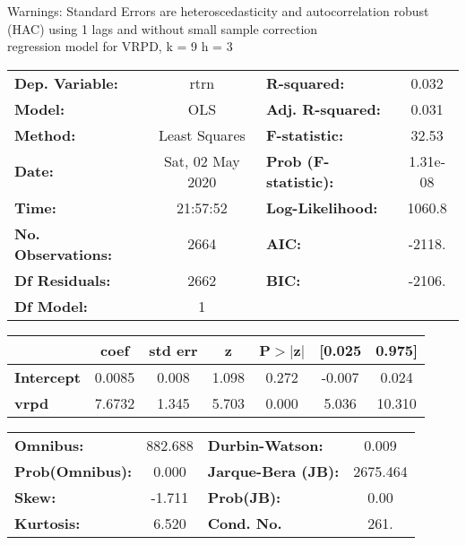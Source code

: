 Warnings: \newline
 [1] Standard Errors are heteroscedasticity and autocorrelation robust (HAC) using 1 lags and without small sample correction\\ 

regression model for VRPD, k = 9 h = 3\begin{center}
\begin{tabular}{lclc}
\toprule
\textbf{Dep. Variable:}    &       rtrn       & \textbf{  R-squared:         } &     0.032   \\
\textbf{Model:}            &       OLS        & \textbf{  Adj. R-squared:    } &     0.031   \\
\textbf{Method:}           &  Least Squares   & \textbf{  F-statistic:       } &     32.53   \\
\textbf{Date:}             & Sat, 02 May 2020 & \textbf{  Prob (F-statistic):} &  1.31e-08   \\
\textbf{Time:}             &     21:57:52     & \textbf{  Log-Likelihood:    } &    1060.8   \\
\textbf{No. Observations:} &        2664      & \textbf{  AIC:               } &    -2118.   \\
\textbf{Df Residuals:}     &        2662      & \textbf{  BIC:               } &    -2106.   \\
\textbf{Df Model:}         &           1      & \textbf{                     } &             \\
\bottomrule
\end{tabular}
\begin{tabular}{lcccccc}
                   & \textbf{coef} & \textbf{std err} & \textbf{z} & \textbf{P$> |$z$|$} & \textbf{[0.025} & \textbf{0.975]}  \\
\midrule
\textbf{Intercept} &       0.0085  &        0.008     &     1.098  &         0.272        &       -0.007    &        0.024     \\
\textbf{vrpd}      &       7.6732  &        1.345     &     5.703  &         0.000        &        5.036    &       10.310     \\
\bottomrule
\end{tabular}
\begin{tabular}{lclc}
\textbf{Omnibus:}       & 882.688 & \textbf{  Durbin-Watson:     } &    0.009  \\
\textbf{Prob(Omnibus):} &   0.000 & \textbf{  Jarque-Bera (JB):  } & 2675.464  \\
\textbf{Skew:}          &  -1.711 & \textbf{  Prob(JB):          } &     0.00  \\
\textbf{Kurtosis:}      &   6.520 & \textbf{  Cond. No.          } &     261.  \\
\bottomrule
\end{tabular}
\end{center}

